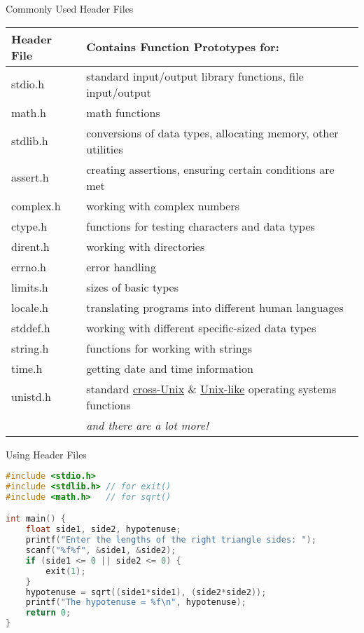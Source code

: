 \documentclass[graphics]{beamer}
\begin{document}
\begin{frame}{Commonly Used Header Files}
    \begin{tabular}{l l}
        Header File & Contains Function Prototypes for: \\ \hline
        stdio.h  & standard input/output library functions, file input/output \\
        math.h   & math functions \\
        stdlib.h & conversions of data types, allocating memory, other utilities \\
        assert.h & creating assertions, ensuring certain conditions are met \\
        complex.h & working with complex numbers \\
        ctype.h  & functions for testing characters and data types \\
        dirent.h & working with directories \\
        errno.h  & error handling \\
        limits.h & sizes of basic types \\
        locale.h & translating programs into different human languages \\
        stddef.h & working with different specific-sized data types \\
        string.h & functions for working with strings \\
        time.h   & getting date and time information \\
        unistd.h & standard \underline{cross-Unix} \& \underline{Unix-like} operating systems functions \\
                 & \textit{and there are a lot more!}
    \end{tabular}
\end{frame}

\begin{frame}[fragile]{Using Header Files}
    \begin{lstlisting}[language=C,basicstyle=\footnotesize,keywordstyle=\color{blue},commentstyle=\color{green},showstringspaces=false,stringstyle=\color{red}]
#include <stdio.h>
#include <stdlib.h> // for exit()
#include <math.h>   // for sqrt()

int main() {
    float side1, side2, hypotenuse;
    printf("Enter the lengths of the right triangle sides: ");
    scanf("%f%f", &side1, &side2);
    if (side1 <= 0 || side2 <= 0) {
        exit(1);
    }
    hypotenuse = sqrt((side1*side1), (side2*side2));
    printf("The hypotenuse = %f\n", hypotenuse);
    return 0;
}
    \end{lstlisting}
    
\end{frame}
\end{document}
